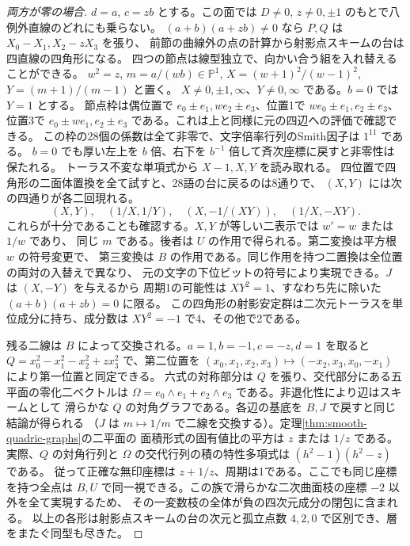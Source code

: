 \begin{proof}[両方が零の場合]
$d=a$, $c=zb$ とする。この面では $D\ne0$, $z\ne0,\pm1$ のもとで八例外直線のどれにも乗らない。
$(a+b)(a+zb)\ne0$ なら $P,Q$ は $X_0-X_1,X_2-zX_3$ を張り、
前節の曲線外の点の計算から射影点スキームの台は四直線の四角形になる。
四つの節点は線型独立で、向かい合う組を入れ替えることができる。
$w^2=z$, $m=a/(wb)\in\mathbb P^1$, $X=(w+1)^2/(w-1)^2$, $Y=(m+1)/(m-1)$ と置く。
$X\ne0,\pm1,\infty$、$Y\ne0,\infty$ である。$b=0$ では $Y=1$ とする。
節点枠は偶位置で $e_0\pm e_1,we_2\pm e_3$、位置1で $we_0\pm e_1,e_2\pm e_3$、
位置3で $e_0\pm we_1,e_2\pm e_3$ である。これは上と同様に元の四辺への評価で確認できる。
この枠の28個の係数は全て非零で、文字倍率行列のSmith因子は $1^{11}$ である。
$b=0$ でも厚い左上を $b$ 倍、右下を $b^{-1}$ 倍して斉次座標に戻すと非零性は保たれる。
トーラス不変な単項式から $X-1,X,Y$ を読み取れる。
四位置で四角形の二面体置換を全て試すと、28語の台に戻るのは8通りで、
$(X,Y)$ には次の四通りが各二回現れる。
\[
 (X,Y),\quad(1/X,1/Y),\quad(X,-1/(XY)),\quad(1/X,-XY).
\]
これらが十分であることも確認する。$X,Y$ が等しい二表示では $w'=w$ または $1/w$ であり、
同じ $m$ である。後者は $U$ の作用で得られる。第二変換は平方根 $w$ の符号変更で、
第三変換は $B$ の作用である。同じ作用を持つ二置換は全位置の両対の入替えで異なり、
元の文字の下位ビットの符号により実現できる。$J$ は $(X,-Y)$ を与えるから
周期1の可能性は $XY^2=1$、すなわち先に除いた $(a+b)(a+zb)=0$ に限る。
この四角形の射影安定群は二次元トーラスを単位成分に持ち、成分数は $XY^2=-1$ で4、その他で2である。

残る二線は $B$ によって交換される。$a=1,b=-1,c=-z,d=1$ を取ると
$Q=x_0^2-x_1^2-x_2^2+zx_3^2$ で、第二位置を
$(x_0,x_1,x_2,x_3)\mapsto(-x_2,x_3,x_0,-x_1)$ により第一位置と同定できる。
六式の対称部分は $Q$ を張り、交代部分にある五平面の零化二ベクトルは
$\Omega=e_0\wedge e_1+e_2\wedge e_3$ である。非退化性により辺はスキームとして
滑らかな $Q$ の対角グラフである。各辺の基底を $B,J$ で戻すと同じ結論が得られる
（$J$ は $m\mapsto1/m$ で二線を交換する）。定理\ref{thm:smooth-quadric-graphs}の二平面の
面積形式の固有値比の平方は $z$ または $1/z$ である。実際、$Q$ の対角行列と
$\Omega$ の交代行列の積の特性多項式は $(h^2-1)(h^2-z)$ である。
従って正確な無印座標は $z+1/z$、周期は1である。ここでも同じ座標を持つ全点は
$B,U$ で同一視できる。この族で滑らかな二次曲面枝の座標 $-2$ 以外を全て実現するため、
その一変数枝の全体が負の四次元成分の閉包に含まれる。
以上の各形は射影点スキームの台の次元と孤立点数 $4,2,0$ で区別でき、層をまたぐ同型も尽きた。
\end{proof}

